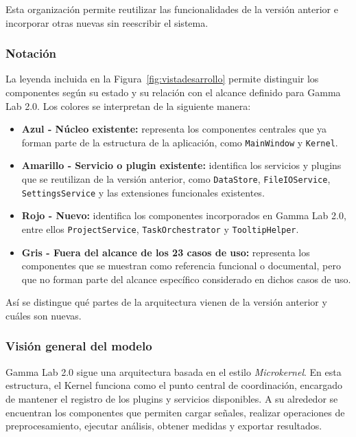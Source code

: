 \documentclass[11pt,a4paper]{article}
\DeclareRobustCommand{\_}{\textunderscore\allowbreak}
\begin{document}
Esta organización permite reutilizar las funcionalidades de la versión anterior e incorporar otras nuevas sin reescribir el sistema.

\subsubsection{Notación}
La leyenda incluida en la Figura~\ref{fig:vistadesarrollo} permite distinguir los componentes según su estado y su relación con el alcance definido para Gamma Lab 2.0. Los colores se interpretan de la siguiente manera:

\begin{itemize}
    \item \textbf{Azul - Núcleo existente:} representa los componentes centrales que ya forman parte de la estructura de la aplicación, como \texttt{MainWindow} y \texttt{Kernel}.

    \item \textbf{Amarillo - Servicio o plugin existente:} identifica los servicios y plugins que se reutilizan de la versión anterior, como \texttt{DataStore}, \texttt{FileIOService}, \texttt{SettingsService} y las extensiones funcionales existentes.

    \item \textbf{Rojo - Nuevo:} identifica los componentes incorporados en Gamma Lab 2.0, entre ellos \texttt{ProjectService}, \texttt{TaskOrchestrator} y \texttt{TooltipHelper}.

    \item \textbf{Gris - Fuera del alcance de los 23 casos de uso:} representa los componentes que se muestran como referencia funcional o documental, pero que no forman parte del alcance específico considerado en dichos casos de uso.
\end{itemize}

Así se distingue qué partes de la arquitectura vienen de la versión anterior y cuáles son nuevas.


\subsubsection{Visión general del modelo}
Gamma Lab 2.0 sigue una arquitectura basada en el estilo \textit{Microkernel}. En esta estructura, el Kernel funciona como el punto central de coordinación, encargado de mantener el registro de los plugins y servicios disponibles. A su alrededor se encuentran los componentes que permiten cargar señales, realizar operaciones de preprocesamiento, ejecutar análisis, obtener medidas y exportar resultados.
\end{document}
